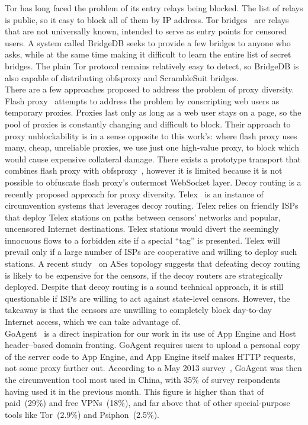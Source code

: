 \documentclass{article}
\begin{document}
Tor has long faced the problem of its entry relays being blocked. The list of
relays is public, so it easy to block all of them by IP address. Tor
bridges~\cite{tor-blocking} are relays that are not universally known, intended
to serve as entry points for censored users. A system called BridgeDB seeks to
provide a few bridges to anyone who asks, while at the same time making it
difficult to learn the entire list of secret bridges. The plain Tor protocol
remains relatively easy to detect, so BridgeDB is also capable of distributing
obfsproxy and ScrambleSuit bridges.\\

There are a few approaches proposed to address the problem of proxy diversity.
Flash proxy~\cite{flashproxy-pets12} attempts to address the problem  by
conscripting web users as temporary proxies. Proxies last only as long as a web
user stays on a page, so the pool of proxies is constantly changing and
difficult to block. Their approach to proxy unblockability is in a sense
opposite to this work's: where flash proxy uses many, cheap, unreliable proxies,
we use just one high-value proxy, to block which would cause expensive
collateral damage. There exists a prototype transport that combines flash proxy
with obfsproxy~\cite{obfs-flash}, however it is limited because it is not
possible to obfuscate flash proxy's outermost WebSocket layer. Decoy routing is
a recently proposed approach for proxy diversity. Telex~\cite{telex} is an
instance of circumvention systems that leverages decoy routing. Telex relies on
friendly ISPs that deploy Telex stations on paths between censors' networks and
popular, uncensored Internet destinations. Telex stations would divert the
seemingly  innocuous flows to a forbidden site if a special ``tag'' is
presented. Telex will prevail only if a large number of ISPs are cooperative and
willing to deploy such stations. A recent study~\cite{nodirectionhome} on ASes
topology suggests that defeating decoy routing is likely to be expensive for the
censors, if the decoy routers are strategically deployed. Despite that decoy
routing is a sound technical approach, it is still questionable if ISPs are
willing to act against state-level censors. However, the takeaway is that the
censors are unwilling to completely block day-to-day Internet access, which we
can take advantage of.\\

GoAgent~\cite{goagent} is a direct inspiration for our work in its use of App
Engine and Host header--based domain fronting. GoAgent requires users to upload
a personal copy of the server code to App Engine, and App Engine itself makes
HTTP requests, not some proxy farther out. According to a May 2013 survey~\cite
{collateral-freedom},  GoAgent was then the circumvention tool most used in
China, with 35\% of survey respondents having used it in the previous month.
This figure is higher than that of paid~(29\%) and free VPNs~(18\%), and far
above that of other special-purpose tools like Tor~(2.9\%) and Psiphon~(2.5\%).
\\
\end{document}
